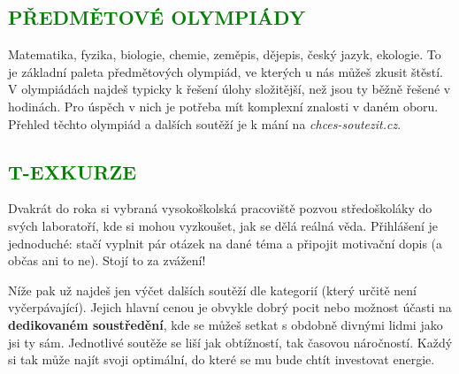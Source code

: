 \documentclass[a5paper, twoside]{article}
\newcommand{\podnadpis}[2]{
  \subsection*{\textcolor{#2}{#1}}
}
\begin{document}
\podnadpis{PŘEDMĚTOVÉ OLYMPIÁDY}{green}
Matematika, fyzika, biologie, chemie, zeměpis, dějepis, český jazyk, ekologie. To je základní paleta předmětových olympiád, ve kterých u nás můžeš zkusit štěstí. V olympiádách najdeš typicky k řešení úlohy složitější, než jsou ty běžně řešené v hodinách. Pro úspěch v nich je potřeba mít komplexní znalosti v daném oboru. Přehled těchto olympiád a dalších soutěží je k mání na \textit{chces-soutezit.cz}.

\podnadpis{T-EXKURZE}{green}
Dvakrát do roka si vybraná vysokoškolská pracoviště pozvou středoškoláky do svých laboratoří, kde si mohou vyzkoušet, jak se dělá reálná věda. Přihlášení je jednoduché: stačí vyplnit pár otázek na dané téma a připojit motivační dopis (a občas ani to ne). Stojí to za zvážení!
\par \noindent Níže pak už najdeš jen výčet dalších soutěží dle kategorií (který určitě není vyčerpávající). Jejich hlavní cenou je obvykle dobrý pocit nebo možnost účasti na \textbf{dedikovaném soustředění}, kde se můžeš setkat s obdobně divnými lidmi jako jsi ty sám. Jednotlivé soutěže se liší jak obtížností, tak časovou náročností. Každý si tak může najít svoji optimální, do které se mu bude chtít investovat energie.
\end{document}
